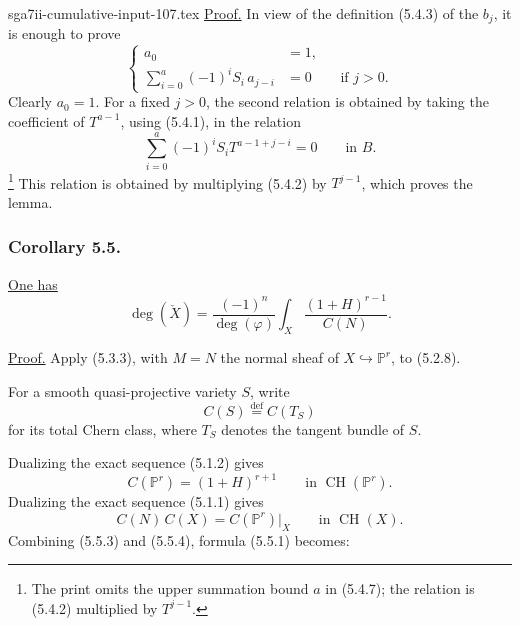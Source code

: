 \begin{filecontents*}{sga7ii-cumulative-input-107.tex}
\noindent\underline{Proof.}
In view of the definition (5.4.3) of the $b_j$, it is enough to prove
\begin{equation}\tag{5.4.6}
\left\{
\begin{aligned}
a_0&=1,\\
\sum_{i=0}^{a}(-1)^iS_i\,a_{j-i}&=0
&&\text{if }j>0.
\end{aligned}
\right.
\end{equation}
Clearly $a_0=1$.  For a fixed $j>0$, the second relation is obtained
by taking the coefficient of $T^{a-1}$, using (5.4.1), in the
relation
\begin{equation}\tag{5.4.7}
\sum_{i=0}^{a}(-1)^iS_iT^{a-1+j-i}=0
\qquad\text{in }B.
\end{equation}
\footnote{The print omits the upper summation bound $a$ in (5.4.7);
the relation is (5.4.2) multiplied by $T^{j-1}$.}
This relation is obtained by multiplying (5.4.2) by $T^{j-1}$,
which proves the lemma.

\subsubsection*{Corollary 5.5.}
\underline{One has}
\begin{equation}\tag{5.5.1}
\deg(\check X)
=\frac{(-1)^n}{\deg(\varphi)}
\int_X\frac{(1+H)^{r-1}}{C(N)}.
\end{equation}

\noindent\underline{Proof.}
Apply (5.3.3), with $M=N$ the normal sheaf of
$X\hookrightarrow\mathbb P^r$, to (5.2.8).

For a smooth quasi-projective variety $S$, write
\begin{equation}\tag{5.5.2}
C(S)\stackrel{\mathrm{def}}{=}C(T_S)
\end{equation}
for its total Chern class, where $T_S$ denotes the tangent bundle of
$S$.

Dualizing the exact sequence (5.1.2) gives
\begin{equation}\tag{5.5.3}
C(\mathbb P^r)=(1+H)^{r+1}
\qquad\text{in }\operatorname{CH}(\mathbb P^r).
\end{equation}
Dualizing the exact sequence (5.1.1) gives
\begin{equation}\tag{5.5.4}
C(N)\,C(X)=C(\mathbb P^r)|_X
\qquad\text{in }\operatorname{CH}(X).
\end{equation}
Combining (5.5.3) and (5.5.4), formula (5.5.1) becomes:


\end{filecontents*}
